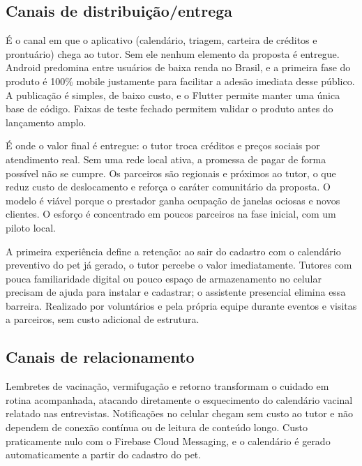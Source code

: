 \subsection{Canais de distribuição/entrega}

{É o canal em que o aplicativo (calendário, triagem, carteira de créditos e prontuário)
chega ao tutor. Sem ele nenhum elemento da proposta é entregue.}
{Android predomina entre usuários de baixa renda no Brasil, e a primeira fase do produto é
100\% mobile justamente para facilitar a adesão imediata desse público.}
{A publicação é simples, de baixo custo, e o Flutter permite manter uma única base de código.
Faixas de teste fechado permitem validar o produto antes do lançamento amplo.}

{É onde o valor final é entregue: o tutor troca créditos e preços sociais por atendimento
real. Sem uma rede local ativa, a promessa de pagar de forma possível não se cumpre.}
{Os parceiros são regionais e próximos ao tutor, o que reduz custo de deslocamento e reforça o
caráter comunitário da proposta.}
{O modelo é viável porque o prestador ganha ocupação de janelas ociosas e novos clientes. O
esforço é concentrado em poucos parceiros na fase inicial, com um piloto local.}

{A primeira experiência define a retenção: ao sair do cadastro com o calendário preventivo do
pet já gerado, o tutor percebe o valor imediatamente.}
{Tutores com pouca familiaridade digital ou pouco espaço de armazenamento no celular
precisam de ajuda para instalar e cadastrar; o assistente presencial elimina essa barreira.}
{Realizado por voluntários e pela própria equipe durante eventos e visitas a parceiros, sem
custo adicional de estrutura.}

\subsection{Canais de relacionamento}

{Lembretes de vacinação, vermifugação e retorno transformam o cuidado em rotina
acompanhada, atacando diretamente o esquecimento do calendário vacinal relatado nas
entrevistas.}
{Notificações no celular chegam sem custo ao tutor e não dependem de conexão contínua ou de
leitura de conteúdo longo.}
{Custo praticamente nulo com o Firebase Cloud Messaging, e o calendário é gerado
automaticamente a partir do cadastro do pet.}

